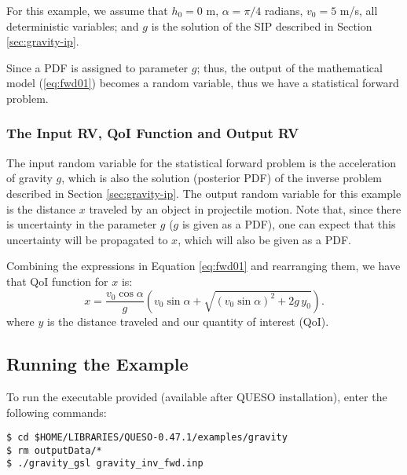 For this example, we assume that $h_0 =0$ m, $\alpha = \pi/4$ radians, $v_0 = 5$ m/s, all deterministic variables; and $g$ is the solution of the SIP described in Section \ref{sec:gravity-ip}.

Since a PDF is assigned to parameter $g$; thus, the output of the mathematical model (\ref{eq:fwd01}) becomes a random variable, thus we have a statistical forward problem. 

\subsubsection{The Input RV, QoI Function and Output RV}
 
The input random variable for the statistical forward problem is the acceleration of gravity $g$, which is also the solution (posterior PDF) of the inverse problem described in Section \ref{sec:gravity-ip}. The output random variable for this example is the distance $x$ traveled by an object in projectile motion. Note that, since there is uncertainty in the parameter $g$ ($g$ is given as a PDF), one can expect that this uncertainty will be propagated to $x$, which will also be given as a PDF.

Combining the expressions in Equation \ref{eq:fwd01} and rearranging them, we have that QoI function for $x$ %
is: 
\begin{equation}\label{eq:fp_deterministic}
x=\dfrac{ v_0 \cos \alpha }{g} \left( v_0  \sin \alpha  + \sqrt{ ( v_0  \sin \alpha)^2 + 2g\, y_0 }\right).                                                                                        
\end{equation}
where $y$ is the distance traveled and our quantity of interest (QoI). 



\subsection{Running the Example}\label{sec:gravity-run}
 
To run the executable provided (available after QUESO installation), enter the following commands:
\begin{lstlisting}[label={},caption={}]
$ cd $HOME/LIBRARIES/QUESO-0.47.1/examples/gravity
$ rm outputData/*
$ ./gravity_gsl gravity_inv_fwd.inp
\end{lstlisting}


